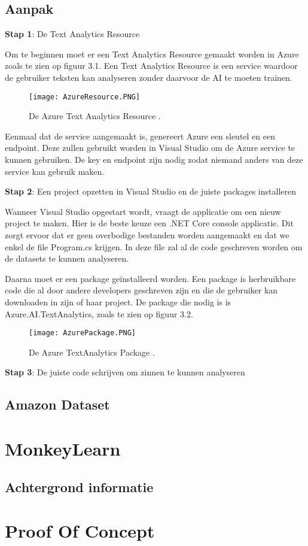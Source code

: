 \subsection{Aanpak}
\label{aanpakazure}
\textbf{Stap 1}: De Text Analytics Resource

Om te beginnen moet er een Text Analytics Resource gemaakt worden in Azure zoals te zien op figuur 3.1. Een Text Analytics Resource is een service waardoor de gebruiker teksten kan analyseren zonder daarvoor de AI te moeten trainen. \autocite{Microsoft2020}

\begin{figure}[!htbp]
    \texttt{[image: AzureResource.PNG]}
    \caption{\label{azureresource}De Azure Text Analytics Resource \autocite{Microsoft2021}.}
\end{figure}
\FloatBarrier

Eenmaal dat de service aangemaakt is, genereert Azure een sleutel en een endpoint. Deze zullen gebruikt worden in Visual Studio om de Azure service te kunnen gebruiken. De key en endpoint zijn nodig zodat niemand anders van deze service kan gebruik maken. 

\textbf{Stap 2}: Een project opzetten in Visual Studio en de juiste packages installeren

Wanneer Visual Studio opgestart wordt, vraagt de applicatie om een nieuw project te maken. Hier is de beste keuze een .NET Core console applicatie. Dit zorgt ervoor dat er geen overbodige bestanden worden aangemaakt en dat we enkel de file Program.cs krijgen. In deze file zal al de code geschreven worden om de datasets te kunnen analyseren. \autocite{Microsoft2020}

Daarna moet er een package geïnstalleerd worden. Een package is herbruikbare code die al door andere developers geschreven zijn en die de gebruiker kan downloaden in zijn of haar project. \autocite{Microsoft2018} De package die nodig is is Azure.AI.TextAnalytics, zoals te zien op figuur 3.2.

\begin{figure}[!htbp]
    \texttt{[image: AzurePackage.PNG]}
    \caption{\label{azurepackage}De Azure TextAnalytics Package \autocite{Microsoft2020}.}
\end{figure}
\FloatBarrier


\textbf{Stap 3}: De juiste code schrijven om zinnen te kunnen analyseren


\subsection{Amazon Dataset}
\label{amazondatasetazure}

\section{MonkeyLearn}

\subsection{Achtergrond informatie}
\label{achtergrondinformatiemonkeylearn}

\section{Proof Of Concept}

